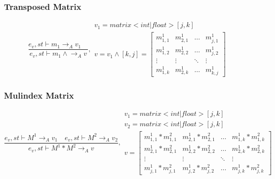 \subsubsection{Transposed Matrix}
\begin{equation}
	\frac { { e }_{ v },st\vdash { m }_{ 1 }{ \rightarrow  }_{ A }{ v }_{ 1 }\quad  }{ { e }_{ v },st\vdash { m }_{ 1 }\wedge { \rightarrow  }_{ A }{ v } } ,\begin{matrix} { v }_{ 1 }=matrix<int|float>[j,k] \\ { v }={ v }_{ 1 }\wedge[k,j] =\begin{bmatrix} { { m }_{ 1,1 }^{ 1 } } & { { m }_{ 2,1 }^{ 1 } } & \dots  & { m }_{ j,1 }^{ 1 } \\
{ { m }_{ 1,2 }^{ 1 } }  &  { { m }_{ 2,2 }^{ 1 } } & \dots & { m }_{ j,2 }^{ 1 }
\\ \vdots  & \vdots & \ddots  & \vdots \\
 { m }_{ 1,k }^{ 1 } & { m }_{ 2,k }^{ 1 } & \dots & { m }_{ k,j }^{ 1 } \end{bmatrix} \end{matrix}
\end{equation}

\subsubsection{Mulindex Matrix}
\begin{equation}
	\frac { { e }_{ v },st\vdash { M }^{ 1 }{ \rightarrow  }_{ A }{ v }_{ 1 }\quad { e }_{ v },st\vdash { M }^{ 2 }{ \rightarrow  }_{ A }{ v }_{ 2 } }{ { e }_{ v },st\vdash { M }^{ 1 }\ast { M }^{ 2 }{ \rightarrow  }_{ A }{ v } } ,\begin{matrix} { v }_{ 1 }=matrix<int|float>[j,k] \\ { { v }_{ 2 } }=matrix<int|float>[j,k] \\ v=\begin{bmatrix} { { m }_{ 1,1 }^{ 1 } } * { { m }_{ 1,1 }^{ 2 } } & { { m }_{ 2,1 }^{ 1 } } * { { m }_{ 2,1 }^{ 2 } } & \dots  & { m }_{ 1,k }^{ 1 } * { { m }_{ 1,k }^{ 2} } \\
{ { m }_{ 2,1 }^{ 1 } } * { { m }_{ 2,1 }^{ 2 } } &  { { m }_{ 2,2 }^{ 1 } } * { { m }_{ 2,2 }^{ 2 } } & \dots & { { m }_{ 2,k }^{ 1 } }  * { { m }_{ 2,k }^{ 2 } }
\\ \vdots  & \vdots & \ddots  & \vdots \\
 { m }_{ j,1 }^{ 1 } * { { m }_{ j,1 }^{ 2 } } & { { m }_{ j,2 }^{ 1 } } * { { m }_{ j,2 }^{ 2 } }  & \dots & { m }_{ j,k }^{ 1 } * { { m }_{ j,k }^{ 2 } } \end{bmatrix} \end{matrix}
\end{equation}


